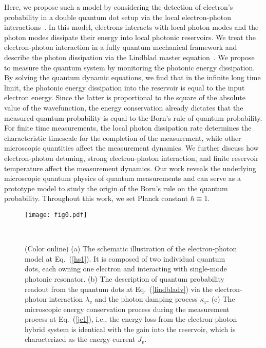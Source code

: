 \documentclass[twocolumn,showpacs,preprintnumbers,amsmath,amssymb]{revtex4}
\begin{document}
Here, we propose such a model by considering the detection of electron's probability in a double quantum dot setup via the local electron-photon interactions~\cite{mrd2011prl,yyliu2014prl,xmi2017science,trh2018prl}. In this model, electrons interacts with local photon modes and the photon modes dissipate their energy into local photonic reservoirs. We treat the electron-photon interaction in a fully quantum mechanical framework and describe the photon dissipation via the Lindblad master equation~\cite{uweiss2012book,hpb2002book}. We propose to measure the quantum system by monitoring the photonic energy dissipation. By solving the quantum dynamic equations, we find that in the infinite long time limit, the photonic energy dissipation into the reservoir is equal to the input electron energy. Since the latter is proportional to the square of the absolute value of the wavefunction, the energy conservation already dictates that the measured quantum probability is equal to the Born's rule of quantum probability. For finite time measurements, the local photon dissipation rate determines the characteristic timescale for the completion of the measurement, while other microscopic quantities affect the measurement dynamics. We further discuss how electron-photon detuning, strong electron-photon interaction, and finite reservoir temperature affect the measurement dynamics. Our work reveals the underlying microscopic quantum physics of quantum measurements and can serve as a prototype model to study the origin of the Born's rule on the quantum probability.
Throughout this work, we set Planck constant $\hbar\equiv1$.
	
	
		
	\begin{figure}[tbp]
		\begin{center}
			\texttt{[image: fig0.pdf]}
			\caption{(Color online)
				(a) The schematic illustration of the electron-photon model at Eq.~(\ref{hs1}).
				It is composed of two individual quantum dots, each owning one electron and interacting with single-mode photonic resonator.
				(b) The description of quantum probability readout from the quantum dots at Eq.~(\ref{lindbladv}) via the electron-photon interaction $\lambda_v$ and the photon damping process $\kappa_v$.
				(c) The microscopic energy conservation process during the measurement process at Eq.~(\ref{je1}), i.e., the energy loss from the electron-photon hybrid system is identical with the gain into the reservoir, which is characterized as the energy current $J_v$.
			}~\label{fig0}
		\end{center}
	\end{figure}
	
\end{document}
